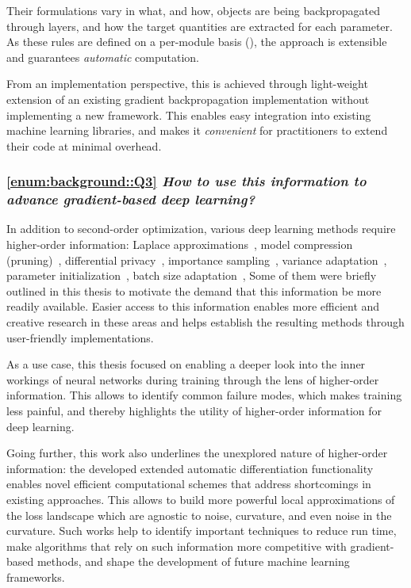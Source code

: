Their formulations vary in what, and how, objects are being backpropagated
through layers, and how the target quantities are extracted for each parameter.
As these rules are defined on a per-module basis
(), the approach is extensible and guarantees
\emph{automatic} computation.

From an implementation perspective, this is achieved through light-weight
extension of an existing gradient backpropagation implementation without
implementing a new framework. This enables easy integration into existing
machine learning libraries, and makes it \emph{convenient} for practitioners to
extend their code at minimal overhead.

\subsubsection{\ref{enum:background::Q3} \emph{How to use this information to
    advance gradient-based deep learning?}}

In addition to second-order optimization, various deep learning methods require
higher-order information: Laplace
approximations~\cite[\eg\!][]{daxberger2021laplace}, model compression
(pruning)~\cite[\eg\!][]{singh2020woodfisher}, differential
privacy~\cite[\eg\!][]{abadi2016deep}, importance
sampling~\cite[\eg\!][]{katharopoulos2018samples}, variance
adaptation~\cite[\eg\!][]{balles2022noise}, parameter
initialization~\cite[\eg\!][]{skorski2021revisiting}, batch size
adaptation~\cite[\eg\!][]{balles2017coupling}, \etc Some of them were briefly
outlined in this thesis to motivate the demand that this information be more
readily available. Easier access to this information enables more efficient and
creative research in these areas and helps establish the resulting methods
through user-friendly implementations.

As a use case, this thesis focused on enabling a deeper look into the inner
workings of neural networks during training through the lens of higher-order
information. This allows to identify common failure modes, which makes training
less painful, and thereby highlights the utility of higher-order information for
deep learning.

Going further, this work also underlines the unexplored nature of higher-order
information: the developed extended automatic differentiation functionality
enables novel efficient computational schemes that address shortcomings in
existing approaches. This allows to build more powerful local approximations of
the loss landscape which are agnostic to noise, curvature, and even noise in the
curvature. Such works help to identify important techniques to reduce run time,
make algorithms that rely on such information more competitive with
gradient-based methods, and shape the development of future machine learning
frameworks.

